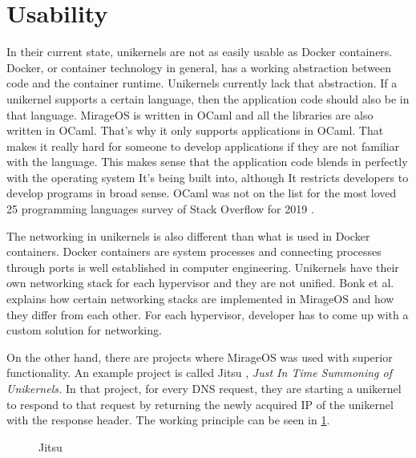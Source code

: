 \section{Usability}
In their current state, unikernels are not as easily usable as Docker containers. Docker, or container technology in general, has a working abstraction between code and the container runtime. Unikernels currently lack that abstraction. If a unikernel supports a certain language, then the application code should also be in that language. MirageOS is written in OCaml and all the libraries are also written in OCaml. That's why it only supports applications in OCaml. That makes it really hard for someone to develop applications if they are not familiar with the language. This makes sense that the application code blends in perfectly with the operating system It's being built into, although It restricts developers to develop programs in broad sense. OCaml was not on the list for the most loved 25 programming languages survey of Stack Overflow for 2019 \cite{2019-survey}.

The networking in unikernels is also different than what is used in Docker containers. Docker containers are system processes and connecting processes through ports is well established in computer engineering. Unikernels have their own networking stack for each hypervisor and they are not unified. Bonk et al. \cite{Bonk} explains how certain networking stacks are implemented in MirageOS and how they differ from each other. For each hypervisor, developer has to come up with a custom solution for networking.

On the other hand, there are projects where MirageOS was used with superior functionality. An example project is called Jitsu \cite{jitsu}, \textit{Just In Time Summoning of Unikernels.} In that project, for every DNS request, they are starting a unikernel to respond to that request by returning the newly acquired IP of the unikernel with the response header. The working principle can be seen in \ref{fig:jitsu}.

\begin{figure}[h!]
\centering
\begin {sequencediagram}


\end {sequencediagram}
\caption{Jitsu \cite{jitsu}}\label{fig:jitsu}
\end{figure}

